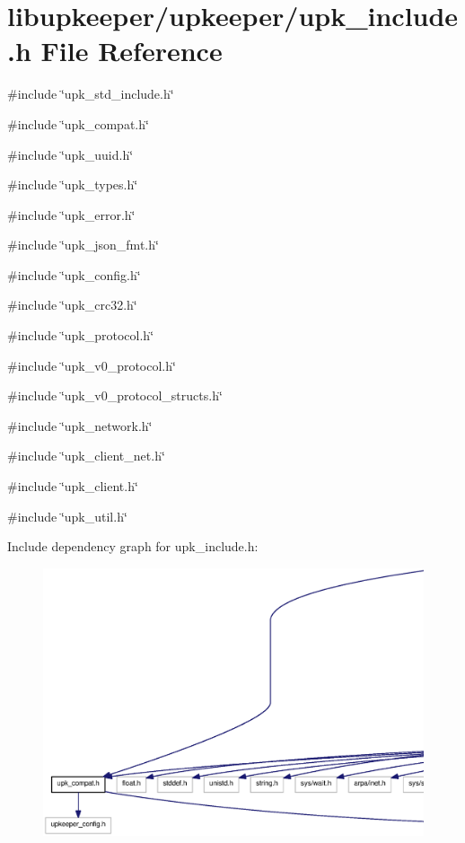 \section{libupkeeper/upkeeper/upk\_\-include.h File Reference}
\label{upk__include_8h}
{\ttfamily \#include \char`\"{}upk\_\-std\_\-include.h\char`\"{}}\par
{\ttfamily \#include \char`\"{}upk\_\-compat.h\char`\"{}}\par
{\ttfamily \#include \char`\"{}upk\_\-uuid.h\char`\"{}}\par
{\ttfamily \#include \char`\"{}upk\_\-types.h\char`\"{}}\par
{\ttfamily \#include \char`\"{}upk\_\-error.h\char`\"{}}\par
{\ttfamily \#include \char`\"{}upk\_\-json\_\-fmt.h\char`\"{}}\par
{\ttfamily \#include \char`\"{}upk\_\-config.h\char`\"{}}\par
{\ttfamily \#include \char`\"{}upk\_\-crc32.h\char`\"{}}\par
{\ttfamily \#include \char`\"{}upk\_\-protocol.h\char`\"{}}\par
{\ttfamily \#include \char`\"{}upk\_\-v0\_\-protocol.h\char`\"{}}\par
{\ttfamily \#include \char`\"{}upk\_\-v0\_\-protocol\_\-structs.h\char`\"{}}\par
{\ttfamily \#include \char`\"{}upk\_\-network.h\char`\"{}}\par
{\ttfamily \#include \char`\"{}upk\_\-client\_\-net.h\char`\"{}}\par
{\ttfamily \#include \char`\"{}upk\_\-client.h\char`\"{}}\par
{\ttfamily \#include \char`\"{}upk\_\-util.h\char`\"{}}\par
Include dependency graph for upk\_\-include.h:
\nopagebreak
\begin{figure}[H]
\begin{center}
\leavevmode
\includegraphics[width=400pt]{upk__include_8h__incl}
\end{center}
\end{figure}
